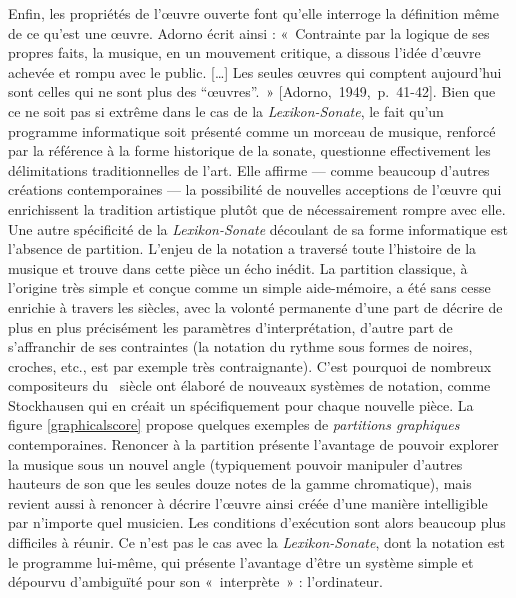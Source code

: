 \documentclass[a4paper,12pt]{article}
\newcommand{\guill}[1]{«~#1~»}
\newcommand{\guilldeux}[1]{“#1”}
\newcommand{\cicite}[1]{{\footnotesize[#1]}}
\begin{document}
Enfin, les propriétés de l'œuvre ouverte font qu'elle interroge la définition même de ce qu'est une œuvre. Adorno écrit ainsi : \guill{Contrainte par la logique de ses propres faits, la musique, en un mouvement critique, a dissous l'idée d'œuvre achevée et rompu avec le public. [\dots] Les seules œuvres qui comptent aujourd'hui sont celles qui ne sont plus des \guilldeux{œuvres}.} \cicite{Adorno,~1949,~p.~41-42}. Bien que ce ne soit pas si extrême dans le cas de la \emph{Lexikon-Sonate}, le fait qu'un programme informatique soit présenté comme un morceau de musique, renforcé par la référence à la forme historique de la sonate, questionne effectivement les délimitations traditionnelles de l'art. Elle affirme --- comme beaucoup d'autres créations contemporaines --- la possibilité de nouvelles acceptions de l'œuvre qui enrichissent la tradition artistique plutôt que de nécessairement rompre avec elle. \\

Une autre spécificité de la \emph{Lexikon-Sonate} découlant de sa forme informatique est l'absence de partition. L'enjeu de la notation a traversé toute l'histoire de la musique et trouve dans cette pièce un écho inédit. La partition classique, à l'origine très simple et conçue comme un simple aide-mémoire, a été sans cesse enrichie à travers les siècles, avec la volonté permanente d'une part de décrire de plus en plus précisément les paramètres d'interprétation, d'autre part de s'affranchir de ses contraintes (la notation du rythme sous formes de noires, croches, etc., est par exemple très contraignante). C'est pourquoi de nombreux compositeurs du \XXe~siècle ont élaboré de nouveaux systèmes de notation, comme Stockhausen qui en créait un spécifiquement pour chaque nouvelle pièce. La figure \ref{graphicalscore} propose quelques exemples de \emph{partitions graphiques} contemporaines.
Renoncer à la partition présente l'avantage de pouvoir explorer la musique sous un nouvel angle (typiquement pouvoir manipuler d'autres hauteurs de son que les seules douze notes de la gamme chromatique), mais revient aussi à renoncer à décrire l'œuvre ainsi créée d'une manière intelligible par n'importe quel musicien. Les conditions d'exécution sont alors beaucoup plus difficiles à réunir. Ce n'est pas le cas avec la \emph{Lexikon-Sonate}, dont la notation est le programme lui-même, qui présente l'avantage d'être un système simple et dépourvu d'ambiguïté pour son \guill{interprète} : l'ordinateur.
\end{document}
